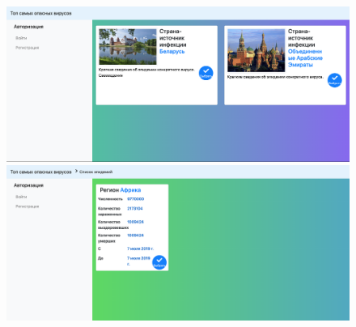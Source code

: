 \documentclass[a4paper,14pt]{extarticle}
\begin{document}
 	\newpage
 	
 	\begin{figure}[h!]
 		\begin{minipage}[b]{0.45\textwidth}
 			\includegraphics[width=\textwidth]{examples/epidemic.png}
 		\end{minipage}
 		\begin{minipage}[b]{0.45\textwidth}
 			\includegraphics[width=\textwidth]{examples/region.png}
 		\end{minipage}
 		\label{ris:epidemic_region}
 	\end{figure}
 
\end{document}
